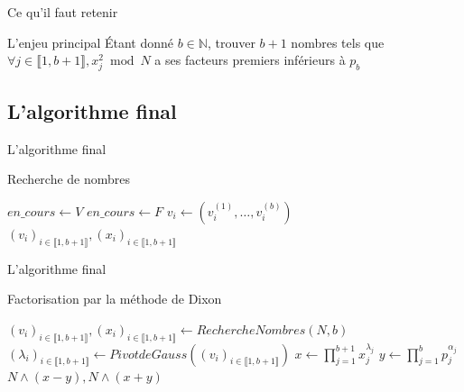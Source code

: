\documentclass{beamer}
\begin{document}
\begin{frame}{Ce qu'il faut retenir}
    \begingroup
    \begin{block}{L'enjeu principal}
        Étant donné $b\in \mathbb N$, trouver $b+1$ nombres tels que $\forall j\in\llbracket 1, b+1\rrbracket, x_j^2 \bmod N$ a ses facteurs premiers inférieurs à $p_b$
    \end{block}
    \endgroup
\end{frame}

\subsection{L'algorithme final}

\begin{frame}{L'algorithme final}
    \begin{algorithm}[H]
    \caption{Recherche de nombres}
    \small
    \begin{algorithmic}[1]
        \Statex
            \State $en\_cours \gets V$
                 
                    \State $en\_cours \gets F$
                    \State $v_i \gets (v_i^{(1)}, \dots, v_i^{(b)})$
                \EndIf
            \EndWhile
        \EndFor
        \Statex
        \Statex
        \Return $(v_i)_{i \in \llbracket 1,b+1 \rrbracket}, (x_i)_{i \in \llbracket 1,b+1 \rrbracket}$
    \end{algorithmic}
    \end{algorithm}
\end{frame}

\begin{frame}{L'algorithme final}
    \begin{algorithm}[H]
    \caption{Factorisation par la méthode de Dixon}
    \begin{algorithmic}[1]
        \Statex
        \State $(v_i)_{i \in \llbracket 1,b+1 \rrbracket}, (x_i)_{i \in \llbracket 1,b+1 \rrbracket} \gets RechercheNombres(N, b)$
        \State $(\lambda_i)_{i \in \llbracket 1,b+1 \rrbracket} \gets PivotdeGauss((v_i)_{i \in \llbracket 1,b+1 \rrbracket})$
        \State $x \gets \prod_{j=1}^{b+1}x_j^{\lambda_j}$
        \State $y \gets \prod_{j=1}^b p_j^{\alpha_j}$
        \Statex\Statex
        \Return $N \land(x-y), N\land(x+y)$
    \end{algorithmic}
    \end{algorithm}
\end{frame}
\end{document}
